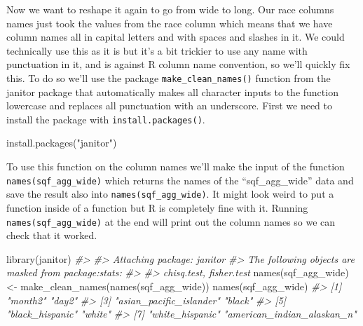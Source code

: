 \documentclass[
]{krantz}
\makeatletter
\newenvironment{Shaded}{\begin{snugshade}}{\end{snugshade}}
\newcommand{\CommentTok}[1]{\textcolor[rgb]{0.37,0.37,0.37}{\textit{#1}}}
\newcommand{\FunctionTok}[1]{\textcolor[rgb]{0,0,0}{#1}}
\newcommand{\NormalTok}[1]{#1}
\newcommand{\OtherTok}[1]{\textcolor[rgb]{0.37,0.37,0.37}{#1}}
\newcommand{\StringTok}[1]{\textcolor[rgb]{0.5,0.5,0.5}{#1}}
\newenvironment{kframe}{%
\medskip{}
\setlength{\fboxsep}{.8em}
 \def\at@end@of@kframe{}%
 \ifinner\ifhmode%
  \def\at@end@of@kframe{\end{minipage}}%
  \begin{minipage}{\columnwidth}%
 \fi\fi%
 \def\FrameCommand##1{\hskip\@totalleftmargin \hskip-\fboxsep
 \colorbox{shadecolor}{##1}\hskip-\fboxsep
     \hskip-\linewidth \hskip-\@totalleftmargin \hskip\columnwidth}%
 \MakeFramed {\advance\hsize-\width
   \@totalleftmargin\z@ \linewidth\hsize
   \@setminipage}}%
 {\par\unskip\endMakeFramed%
 \at@end@of@kframe}
\renewenvironment{Shaded}{\begin{kframe}}{\end{kframe}}
\makeatother
\begin{document}
Now we want to reshape it again to go from wide to long. Our race columns names just took the values from the race column which means that we have column names all in capital letters and with spaces and slashes in it. We could technically use this as it is but it's a bit trickier to use any name with punctuation in it, and is against R column name convention, so we'll quickly fix this. To do so we'll use the package \texttt{make\_clean\_names()} function from the janitor package that automatically makes all character inputs to the function lowercase and replaces all punctuation with an underscore. First we need to install the package with \texttt{install.packages()}.

\begin{Shaded}
\begin{Highlighting}[]
\FunctionTok{install.packages}\NormalTok{(}\StringTok{"janitor"}\NormalTok{)}
\end{Highlighting}
\end{Shaded}

To use this function on the column names we'll make the input of the function \texttt{names(sqf\_agg\_wide)} which returns the names of the ``sqf\_agg\_wide'' data and save the result also into \texttt{names(sqf\_agg\_wide)}. It might look weird to put a function inside of a function but R is completely fine with it. Running \texttt{names(sqf\_agg\_wide)} at the end will print out the column names so we can check that it worked.

\begin{Shaded}
\begin{Highlighting}[]
\FunctionTok{library}\NormalTok{(janitor)}
\CommentTok{\#\textgreater{} }
\CommentTok{\#\textgreater{} Attaching package: \textquotesingle{}janitor\textquotesingle{}}
\CommentTok{\#\textgreater{} The following objects are masked from \textquotesingle{}package:stats\textquotesingle{}:}
\CommentTok{\#\textgreater{} }
\CommentTok{\#\textgreater{}     chisq.test, fisher.test}
\FunctionTok{names}\NormalTok{(sqf\_agg\_wide) }\OtherTok{\textless{}{-}} \FunctionTok{make\_clean\_names}\NormalTok{(}\FunctionTok{names}\NormalTok{(sqf\_agg\_wide))}
\FunctionTok{names}\NormalTok{(sqf\_agg\_wide)}
\CommentTok{\#\textgreater{} [1] "month2"                    "day2"                     }
\CommentTok{\#\textgreater{} [3] "asian\_pacific\_islander"    "black"                    }
\CommentTok{\#\textgreater{} [5] "black\_hispanic"            "white"                    }
\CommentTok{\#\textgreater{} [7] "white\_hispanic"            "american\_indian\_alaskan\_n"}
\end{Highlighting}
\end{Shaded}
\end{document}
